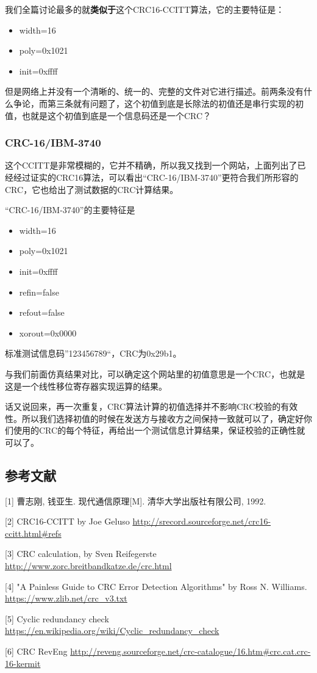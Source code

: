 \documentclass[
]{article}
\begin{document}
我们全篇讨论最多的就\textbf{类似于}这个CRC16-CCITT算法，它的主要特征是：

\begin{itemize}
\item
  width=16
\item
  poly=0x1021
\item
  init=0xffff
\end{itemize}

但是网络上并没有一个清晰的、统一的、完整的文件对它进行描述。前两条没有什么争论，而第三条就有问题了，这个初值到底是长除法的初值还是串行实现的初值，也就是这个初值到底是一个信息码还是一个CRC？

\hypertarget{header-n303}{%
\subsubsection{CRC-16/IBM-3740}\label{header-n303}}

这个CCITT是非常模糊的，它并不精确，所以我又找到一个网站，上面列出了已经经过证实的CRC16算法，可以看出``CRC-16/IBM-3740''更符合我们所形容的CRC，它也给出了测试数据的CRC计算结果。

``CRC-16/IBM-3740''的主要特征是

\begin{itemize}
\item
  width=16
\item
  poly=0x1021
\item
  init=0xffff
\item
  refin=false
\item
  refout=false
\item
  xorout=0x0000
\end{itemize}

标准测试信息码''123456789``，CRC为0x29b1。

与我们前面仿真结果对比，可以确定这个网站里的初值意思是一个CRC，也就是这是一个线性移位寄存器实现运算的结果。

话又说回来，再一次重复，CRC算法计算的初值选择并不影响CRC校验的有效性。所以我们选择初值的时候在发送方与接收方之间保持一致就可以了，确定好你们使用的CRC的每个特征，再给出一个测试信息计算结果，保证校验的正确性就可以了。

\newpage
\hypertarget{header-n322}{%
\subsection{参考文献}\label{header-n322}}

{[}1{]} 曹志刚, 钱亚生. 现代通信原理{[}M{]}. 清华大学出版社有限公司,
1992.

{[}2{]} CRC16-CCITT by Joe Geluso
\url{http://srecord.sourceforge.net/crc16-ccitt.html#refs}

{[}3{]} CRC calculation, by Sven Reifegerste
\url{http://www.zorc.breitbandkatze.de/crc.html}

{[}4{]} "A Painless Guide to CRC Error Detection Algorithms" by Ross N.
Williams. \url{https://www.zlib.net/crc_v3.txt}

{[}5{]} Cyclic redundancy check
\url{https://en.wikipedia.org/wiki/Cyclic_redundancy_check}

{[}6{]} CRC RevEng
\url{http://reveng.sourceforge.net/crc-catalogue/16.htm#crc.cat.crc-16-kermit}
\end{document}

